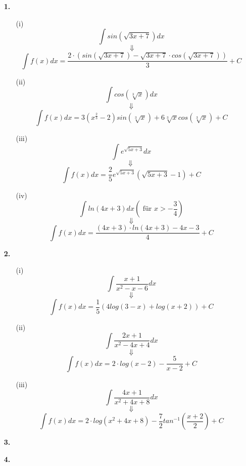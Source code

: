 \documentclass[a4paper,11pt]{article}
\title{\titleinfo}
\author{\authorinfotitle}
\date{\today}
\begin{document}
\maketitle
    \begin{enumerate}
        \item[\textbf{1.}]
         \begin{enumerate}
             \item[(i)]
            $$ \int sin \left( \sqrt{3x+7}\right)dx$$$$ \ \Downarrow $$$$ \int f(x)dx = \frac{2 \cdot (sin (\sqrt{3x+7})-\sqrt{3x+7} \cdot cos(\sqrt{3x+7}))}{3} + C $$
            \item[(ii)]
            $$ \int cos \left( \sqrt[3]{x}\right)dx $$$$ \ \Downarrow \ $$$$  \int f(x)dx = 3\left(x^{\frac{2}{3}}-2\right) sin\left(\sqrt[3]{x}\right) +6\sqrt[3]{x} cos\left(\sqrt[3]{x}\right) + C $$
            \item[(iii)]
            $$ \int e^{\sqrt{5x+3}}dx $$$$ \Downarrow \ $$$$ \int f(x)dx = \frac{2}{5}e^{\sqrt{5x+3}}(\sqrt{5x+3}-1) + C $$
            \item[(iv)]
            $$ \int ln (4x+3)dx \left(\text{ für } x > - \frac{3}{4}\right)  $$$$\ \Downarrow \ $$$$ \int f(x)dx = \frac{(4x+3) \cdot ln(4x+3) -4x -3}{4} + C $$

         \end{enumerate}
              
        \item[\textbf{2.}]
        \begin{enumerate}
            \item[(i)]
             $$\int \frac{x+1}{x^2-x-6}dx $$$$ \Downarrow $$$$  \int f(x)dx = \frac{1}{5}(4log(3-x)+log(x+2)) +C $$
             \item[(ii)]
             $$ \int \frac{2x+1}{x^2-4x+4}dx $$$$ \Downarrow $$$$  \int f(x)dx = 2 \cdot log(x-2) - \frac{5}{x-2} + C $$
             \item[(iii)] 
             $$ \int \frac{4x+1}{x^2+4x+8}dx  $$$$ \Downarrow $$$$  \int f(x)dx = 2 \cdot log(x^2+4x+8) - \frac{7}{2}tan^{-1}\left(\frac{x+2}{2}\right) +C $$
 
        \end{enumerate}



        \item[\textbf{3.}]
         
	\todo

        \item[\textbf{4.}]
	\todo

    \end{enumerate}
\end{document}
